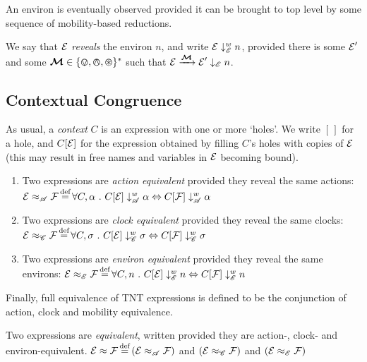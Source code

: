 \documentclass[orivec]{llncs}
\newcommand{\Exhibits}[1]{\mathrel{\downarrow_{#1}}}
\newcommand{\ExhibitsE}{\Exhibits{\mathscr{E}}}
\newcommand{\Reveals}[1]{\mathrel{\downarrow^{w}_{#1}}}
\newcommand{\RevealsA}{\Reveals{\mathscr{A}}}
\newcommand{\RevealsC}{\Reveals{\mathscr{C}}}
\newcommand{\RevealsE}{\Reveals{\mathscr{E}}}
\newcommand{\Eq}{\approx}
\newcommand{\EqA}{\mathrel{\Eq_{\mathscr{A}}}}
\newcommand{\EqC}{\mathrel{\Eq_{\mathscr{C}}}}
\newcommand{\EqE}{\mathrel{\Eq_{\mathscr{E}}}}
\newcommand{\Means}{\eqdef}
\newcommand{\Does}[1]{\xderives{#1}}
\begin{document}
An environ is eventually observed provided it can be brought to top level by some sequence of mobility-based reductions.

\begin{definition}
We say that $\text{$\mathcal{E}$}$ \emph{reveals} the environ $n$, and write $\expr \RevealsE n$, provided there is some $\text{$\mathcal{E}$}'$ and some $\vec{\ambop} \in \{\tin, \tout, \topen\}^*$ such that $\expr \Does{\vec{\ambop}} \expr' \ExhibitsE n$.
\end{definition}




\subsection{Contextual Congruence}
\label{sec:contextual-congruence}

As usual, a \emph{context} $C$ is an expression with one or more `holes'. We write $[\,]$ for a hole, and $C[\text{$\mathcal{E}$}]$ for the expression obtained by filling $C$'s holes with copies of $\text{$\mathcal{E}$}$ (this may result in free names and variables in $\text{$\mathcal{E}$}$ becoming bound).




\begin{definition}
\begin{enumerate}
\item
    Two expressions are \emph{action equivalent} provided they reveal the same actions: 
    $\expr \EqA \exprb
     \Means
     \forall C, \alpha ~.~
     C[\expr] \RevealsA \alpha \Leftrightarrow C[\exprb] \RevealsA \alpha$
\item
    Two expressions are \emph{clock equivalent} provided they reveal the same clocks: 
    $\expr \EqC \exprb
     \Means
     \forall C, \sigma ~.~
     C[\expr] \RevealsC \sigma \Leftrightarrow C[\exprb] \RevealsC \sigma$
\item
    Two expressions are \emph{environ equivalent} provided they reveal the same environs: 
    $\expr \EqE \exprb
     \Means
     \forall C, n ~.~
     C[\expr] \RevealsE n \Leftrightarrow C[\exprb] \RevealsE n$
\end{enumerate}
\end{definition}

Finally, full equivalence of TNT expressions is defined to be the conjunction of action, clock and mobility equivalence.
\begin{definition}
Two expressions are \emph{equivalent}, written provided they are action-, clock- and environ-equivalent.
    $\expr \Eq \exprb
     \Means
     \left( \expr \EqA \exprb \right)$
     and
     $\left( \expr \EqC \exprb \right)$
     and
     $\left( \expr \EqE \exprb \right)$
\end{definition}



\end{document}

